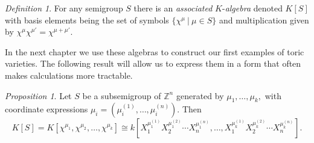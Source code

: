 \documentclass[BSc]{usydthesis}
\numberwithin{equation}{chapter}
\theoremstyle{remark}
\newtheorem{Definition}[equation]{Definition}
\newtheorem{Proposition}[equation]{Proposition}
\newcommand{\Z}{\mathbb{Z}}
\begin{document}
\begin{Definition}For any semigroup $S$ there is an {\em associated} $K$-{\em algebra} denoted $K[S]$ with basis elements being the set of symbols $\{ \chi^\mu \ | \ \mu \in S\}$ and multiplication given by $\chi^{\mu} \chi^{\mu'} = \chi^{\mu+\mu'}.$ 
\end{Definition}

In the next chapter we use these algebras to construct our first examples of toric varieties. The following result will allow us to express them in a form that often makes calculations more tractable.

\begin{Proposition}\label{Iso}
Let $S$ be a subsemigroup of $\Z^n$ generated by $\mu_1,\ldots, \mu_k,$ with coordinate expressions $\mu_i = \left(\mu_i^{(1)},\ldots, \mu_i^{(n)}\right).$ Then $$ K[S] = K[\chi^{\mu_1} , \chi^{\mu_2} , \ldots , \chi^{\mu_k} ] \cong k\left[X_1^{ \mu_1^{(1)}} X_2^{ \mu_1^{(2)} } \cdots X_n^{ \mu_1^{(n)} } , \ldots , X_1^{ \mu_k^{(1)}} X_2^{ \mu_k^{(2)} } \cdots X_n^{ \mu_k^{(n)}}\right].$$ 
\end{Proposition}
\end{document}
